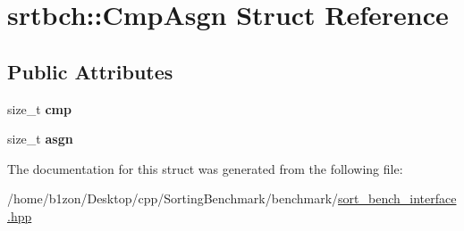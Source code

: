\hypertarget{structsrtbch_1_1CmpAsgn}{}\section{srtbch\+:\+:Cmp\+Asgn Struct Reference}
\label{structsrtbch_1_1CmpAsgn}
\subsection*{Public Attributes}
\begin{DoxyCompactItemize}
\item 
\mbox{\label{structsrtbch_1_1CmpAsgn_a571b89b1db8f5ce7794e2574d8475259}} 
size\+\_\+t {\bfseries cmp}
\item 
\mbox{\label{structsrtbch_1_1CmpAsgn_aec2037c808505148ab163cdf647e9e82}} 
size\+\_\+t {\bfseries asgn}
\end{DoxyCompactItemize}


The documentation for this struct was generated from the following file\+:\begin{DoxyCompactItemize}
\item 
/home/b1zon/\+Desktop/cpp/\+Sorting\+Benchmark/benchmark/\hyperlink{sort__bench__interface_8hpp}{sort\+\_\+bench\+\_\+interface.\+hpp}\end{DoxyCompactItemize}
